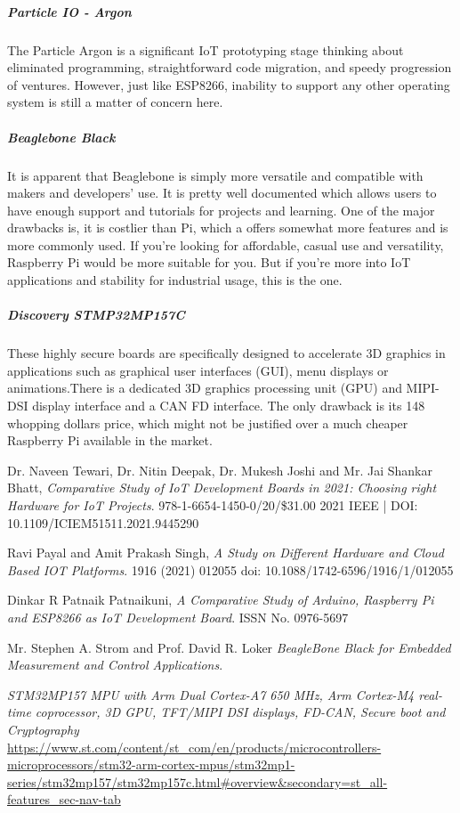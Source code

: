 \documentclass[a4paper,11pt]{article}
\begin{document}
\begin{iotsolution}
\subparagraph{Particle IO - Argon}\cite{compstudy} The Particle Argon is a significant IoT prototyping stage thinking about eliminated programming, straightforward code migration, and speedy progression of ventures. However, just like ESP8266, inability to support any other operating system is still a matter of concern here.

\subparagraph{Beaglebone Black} \cite{bbvr} It is apparent that Beaglebone is simply more versatile and compatible with makers and developers’ use. It is pretty well documented which allows users to have enough support and tutorials for projects and learning. One of the major drawbacks is, it is costlier than Pi, which a offers somewhat more features and is more commonly used.  If you’re looking for affordable, casual use and versatility, Raspberry Pi would be more suitable for you. But if you’re more into IoT applications and stability for industrial usage, this is the one. 

\subparagraph{Discovery STMP32MP157C} \cite{stmp, top21} These highly secure boards are specifically designed to accelerate 3D graphics in applications such as graphical user interfaces (GUI), menu displays or animations.There is a dedicated 3D graphics processing unit (GPU) and MIPI-DSI display interface and a CAN FD interface. The only drawback is its 148 whopping dollars price, which might not be justified over a much cheaper Raspberry Pi available in the market.

\begin{thebibliography}{9}
Dr. Naveen Tewari, Dr. Nitin Deepak, Dr. Mukesh Joshi and Mr. Jai Shankar Bhatt,
\textit{Comparative Study of IoT Development Boards in
2021: Choosing right Hardware for IoT Projects}. 
978-1-6654-1450-0/20/\$31.00 2021 IEEE | DOI: 10.1109/ICIEM51511.2021.9445290

Ravi Payal and Amit Prakash Singh, 
\textit{A Study on Different Hardware and Cloud Based IOT Platforms}.
1916 (2021) 012055 doi: 10.1088/1742-6596/1916/1/012055

Dinkar R Patnaik Patnaikuni,
\textit{A Comparative Study of Arduino, Raspberry Pi and ESP8266 as IoT Development
Board}.
ISSN No. 0976-5697

Mr. Stephen A. Strom and Prof. David R. Loker
\textit{BeagleBone Black for Embedded Measurement and Control Applications}.

\textit{STM32MP157 MPU with Arm Dual Cortex-A7 650 MHz, Arm Cortex-M4 real-time coprocessor, 3D GPU, TFT/MIPI DSI displays, FD-CAN, Secure boot and Cryptography }
\url{https://www.st.com/content/st_com/en/products/microcontrollers-microprocessors/stm32-arm-cortex-mpus/stm32mp1-series/stm32mp157/stm32mp157c.html#overview&secondary=st_all-features_sec-nav-tab}


\end{thebibliography}
\end{iotsolution}
\end{document}
